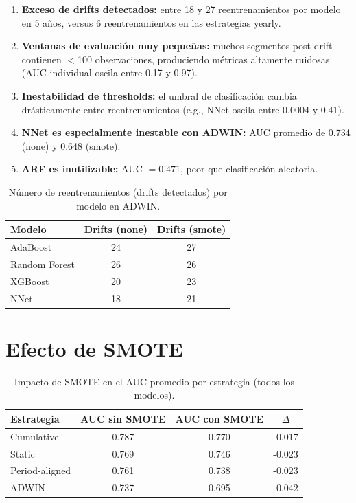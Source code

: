 \documentclass[11pt,a4paper]{article}
\begin{document}
\begin{enumerate}[nosep]
    \item \textbf{Exceso de drifts detectados:} entre 18 y 27 reentrenamientos por modelo en 5 años, versus 6 reentrenamientos en las estrategias yearly.
    \item \textbf{Ventanas de evaluación muy pequeñas:} muchos segmentos post-drift contienen $<$100 observaciones, produciendo métricas altamente ruidosas (AUC individual oscila entre 0.17 y 0.97).
    \item \textbf{Inestabilidad de thresholds:} el umbral de clasificación cambia drásticamente entre reentrenamientos (e.g., NNet oscila entre 0.0004 y 0.41).
    \item \textbf{NNet es especialmente inestable con ADWIN:} AUC promedio de 0.734 (none) y 0.648 (smote).
    \item \textbf{ARF es inutilizable:} AUC $= 0.471$, peor que clasificación aleatoria.
\end{enumerate}

\begin{table}[H]
\centering
\caption{Número de reentrenamientos (drifts detectados) por modelo en ADWIN.}
\label{tab:adwin_drifts}
\begin{tabular}{@{}lcc@{}}
\toprule
\textbf{Modelo} & \textbf{Drifts (none)} & \textbf{Drifts (smote)} \\
\midrule
AdaBoost      & 24 & 27 \\
Random Forest & 26 & 26 \\
XGBoost       & 20 & 23 \\
NNet          & 18 & 21 \\
\bottomrule
\end{tabular}
\end{table}

\section{Efecto de SMOTE}

\begin{table}[H]
\centering
\caption{Impacto de SMOTE en el AUC promedio por estrategia (todos los modelos).}
\label{tab:smote}
\begin{tabular}{@{}lS[table-format=1.3]S[table-format=1.3]S[table-format=+1.3]@{}}
\toprule
\textbf{Estrategia} & {\textbf{AUC sin SMOTE}} & {\textbf{AUC con SMOTE}} & {\textbf{$\Delta$}} \\
\midrule
Cumulative     & 0.787 & 0.770 & -0.017 \\
Static         & 0.769 & 0.746 & -0.023 \\
Period-aligned & 0.761 & 0.738 & -0.023 \\
ADWIN          & 0.737 & 0.695 & -0.042 \\
\bottomrule
\end{tabular}
\end{table}
\end{document}
